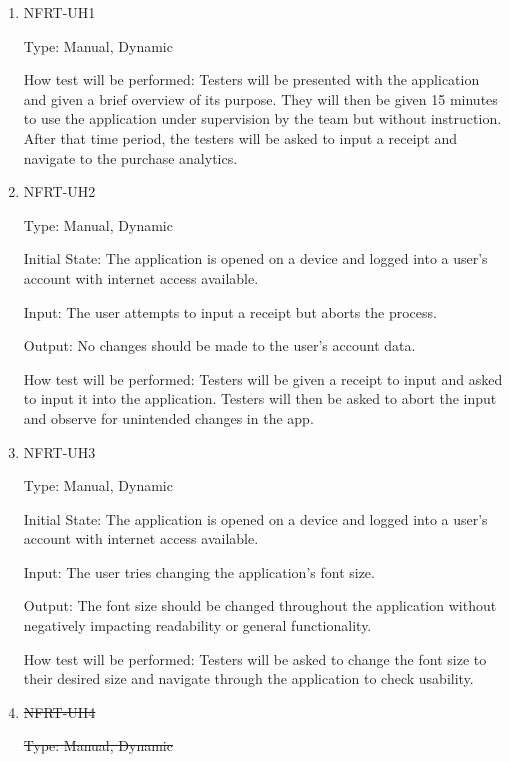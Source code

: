 \documentclass[12pt, titlepage]{article}
\begin{document}
\begin{enumerate}
  \item{NFRT-UH1\\}

  Type: Manual, Dynamic
            
  How test will be performed: Testers will be presented with the
  application and given a brief overview of its purpose. They will then be given 15 minutes to use the application
  under supervision by the team but without instruction. After that time period, the testers will be asked to input
  a receipt and navigate to the purchase analytics.

  \item{NFRT-UH2\\}

  Type: Manual, Dynamic
					
  Initial State: The application is opened on a device and logged into a user's account with internet access available.
					
  Input: The user attempts to input a receipt but aborts the process.
					
  Output: No changes should be made to the user's account data.
  
  How test will be performed: Testers will be given a receipt to input and asked to input it into the application. Testers will then be asked to abort the input and observe for unintended changes in the app.

  \item{NFRT-UH3\\}

  Type: Manual, Dynamic
					
  Initial State: The application is opened on a device and logged into a user's account with internet access available.
					
  Input: The user tries changing the application's font size.
					
  Output: The font size should be changed throughout the application without negatively impacting readability
  or general functionality.
  
  How test will be performed: Testers will be asked to change the font size to their desired size and
  navigate through the application to check usability.

  \item{\sout{NFRT-UH4\\}}

  \sout{Type: Manual, Dynamic}
					

\end{enumerate}
\end{document}
